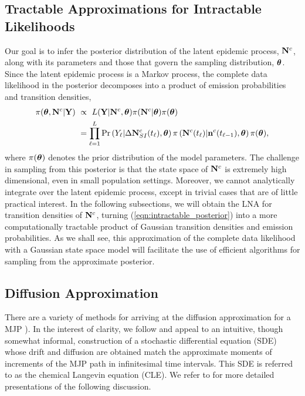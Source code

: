 \subsection{Tractable Approximations for Intractable Likelihoods}
\label{subsec:lna_motivation}
Our goal is to infer the posterior distribution of the latent epidemic process, $ \mathbf{N}^c $, along with its parameters and those that govern the sampling distribution, $ \boldsymbol{\theta} $. Since the latent epidemic process is a Markov process, the complete data likelihood in the posterior decomposes into a product of emission probabilities and transition densities, 
\begin{align}
\label{eqn:intractable_posterior}
\pi(\btheta,\bN^c|\bY)\ &\propto\   L(\bY|\bN^c,\btheta)\pi(\bN^c|\btheta)\pi(\btheta)\nonumber\\
&= \prod_{\ell=1}^L \Pr\left (Y_\ell|\Delta\bN_{SI}^c(t_\ell),\btheta\right )\pi\left (\bN^c(t_\ell)|\bn^c(t_{\ell-1}),\btheta\right )\pi(\btheta),
\end{align}
where $ \pi(\boldsymbol{\theta}) $ denotes the prior distribution of the model parameters.
The challenge in sampling from this posterior is that the state space of $ \mathbf{N}^c $ is extremely high dimensional, even in small population settings. 
Moreover, we cannot analytically integrate over the latent epidemic process, except in trivial cases that are of little practical interest. 
In the following subsections, we will obtain the LNA for transition densities of $ \mathbf{N}^c $, turning (\ref{eqn:intractable_posterior}) into a more computationally tractable product of Gaussian transition densities and emission probabilities. As we shall see, this approximation of the complete data likelihood with a Gaussian state space model will facilitate the use of efficient algorithms for sampling from the approximate posterior. 

\subsection{Diffusion Approximation}
\label{subsec:diff_approx}

There are a variety of methods for arriving at the diffusion approximation for a MJP \cite{fuchs2013inference}). In the interest of clarity, we follow \cite{fearnhead2014,golightly2013simulation,golightly2015delayed,wilkinson2011stochastic} and appeal to an intuitive, though somewhat informal, construction of a stochastic differential equation (SDE) whose drift and diffusion are obtained match the approximate moments of increments of the MJP path in infinitesimal time intervals. This SDE is referred to as the chemical Langevin equation (CLE). We refer to \cite{fuchs2013inference,gillespie2000chemical,wallace2012linear} for more detailed presentations of the following discussion. 

